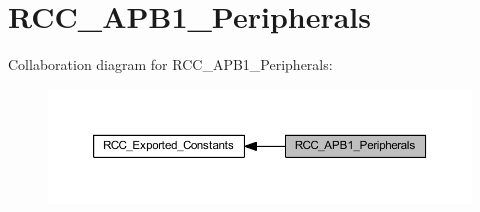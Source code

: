 \hypertarget{group___r_c_c___a_p_b1___peripherals}{}\section{R\+C\+C\+\_\+\+A\+P\+B1\+\_\+\+Peripherals}
\label{group___r_c_c___a_p_b1___peripherals}
Collaboration diagram for R\+C\+C\+\_\+\+A\+P\+B1\+\_\+\+Peripherals\+:
\nopagebreak
\begin{figure}[H]
\begin{center}
\leavevmode
\includegraphics[width=350pt]{group___r_c_c___a_p_b1___peripherals}
\end{center}
\end{figure}
